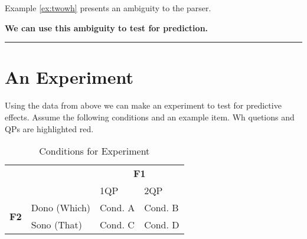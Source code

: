 \documentclass[12pt]{article}
\def\blank{\medskip\hrule\medskip}
\begin{document}
\begin{center}
    Example \ref{ex:twowh} presents an ambiguity to the parser.
\end{center}
\vspace{0.2cm}

\vspace{0.2cm}
\begin{center}
    \textbf{We can use this ambiguity to test for prediction.}
\end{center}

\blank

\section{An Experiment}
Using the data from above we can make an experiment to test for predictive effects.
Assume the following conditions and an example item. Wh quetions and QPs are highlighted red.

\begin{table}[H]
    \centering
    \begin{tabular}{cl|ll|}
    \cline{3-4}
    \multicolumn{1}{l}{}                               &      & \multicolumn{2}{c|}{\textbf{F1}} \\ \cline{3-4} 
    \textbf{}                                          &      & \multicolumn{1}{l|}{1QP}   & 2QP  \\ \hline
    \multicolumn{1}{|c|}{\multirow{2}{*}{\textbf{F2}}} & Dono (Which)   & \multicolumn{1}{l|}{Cond. A }    & Cond. B    \\ \cline{2-4} 
    \multicolumn{1}{|c|}{}                             & Sono (That) & \multicolumn{1}{l|}{Cond. C}    & Cond. D    \\ \hline
    \end{tabular}
    \caption{Conditions for Experiment}
    \label{table:exp2}
\end{table}
\end{document}
